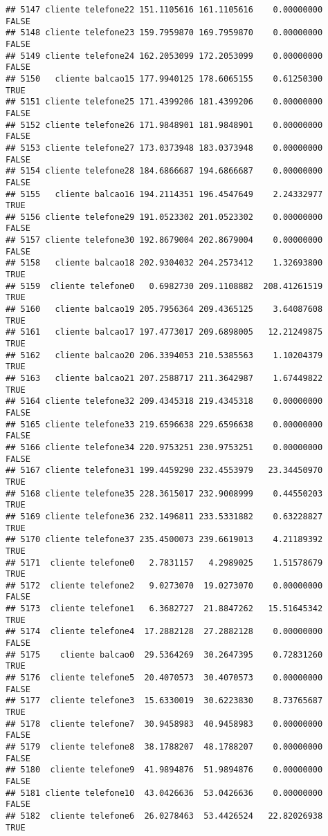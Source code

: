 \documentclass[
]{article}
\begin{document}
\begin{verbatim}
## 5147 cliente telefone22 151.1105616 161.1105616    0.00000000    FALSE
## 5148 cliente telefone23 159.7959870 169.7959870    0.00000000    FALSE
## 5149 cliente telefone24 162.2053099 172.2053099    0.00000000    FALSE
## 5150   cliente balcao15 177.9940125 178.6065155    0.61250300     TRUE
## 5151 cliente telefone25 171.4399206 181.4399206    0.00000000    FALSE
## 5152 cliente telefone26 171.9848901 181.9848901    0.00000000    FALSE
## 5153 cliente telefone27 173.0373948 183.0373948    0.00000000    FALSE
## 5154 cliente telefone28 184.6866687 194.6866687    0.00000000    FALSE
## 5155   cliente balcao16 194.2114351 196.4547649    2.24332977     TRUE
## 5156 cliente telefone29 191.0523302 201.0523302    0.00000000    FALSE
## 5157 cliente telefone30 192.8679004 202.8679004    0.00000000    FALSE
## 5158   cliente balcao18 202.9304032 204.2573412    1.32693800     TRUE
## 5159  cliente telefone0   0.6982730 209.1108882  208.41261519     TRUE
## 5160   cliente balcao19 205.7956364 209.4365125    3.64087608     TRUE
## 5161   cliente balcao17 197.4773017 209.6898005   12.21249875     TRUE
## 5162   cliente balcao20 206.3394053 210.5385563    1.10204379     TRUE
## 5163   cliente balcao21 207.2588717 211.3642987    1.67449822     TRUE
## 5164 cliente telefone32 209.4345318 219.4345318    0.00000000    FALSE
## 5165 cliente telefone33 219.6596638 229.6596638    0.00000000    FALSE
## 5166 cliente telefone34 220.9753251 230.9753251    0.00000000    FALSE
## 5167 cliente telefone31 199.4459290 232.4553979   23.34450970     TRUE
## 5168 cliente telefone35 228.3615017 232.9008999    0.44550203     TRUE
## 5169 cliente telefone36 232.1496811 233.5331882    0.63228827     TRUE
## 5170 cliente telefone37 235.4500073 239.6619013    4.21189392     TRUE
## 5171  cliente telefone0   2.7831157   4.2989025    1.51578679     TRUE
## 5172  cliente telefone2   9.0273070  19.0273070    0.00000000    FALSE
## 5173  cliente telefone1   6.3682727  21.8847262   15.51645342     TRUE
## 5174  cliente telefone4  17.2882128  27.2882128    0.00000000    FALSE
## 5175    cliente balcao0  29.5364269  30.2647395    0.72831260     TRUE
## 5176  cliente telefone5  20.4070573  30.4070573    0.00000000    FALSE
## 5177  cliente telefone3  15.6330019  30.6223830    8.73765687     TRUE
## 5178  cliente telefone7  30.9458983  40.9458983    0.00000000    FALSE
## 5179  cliente telefone8  38.1788207  48.1788207    0.00000000    FALSE
## 5180  cliente telefone9  41.9894876  51.9894876    0.00000000    FALSE
## 5181 cliente telefone10  43.0426636  53.0426636    0.00000000    FALSE
## 5182  cliente telefone6  26.0278463  53.4426524   22.82026938     TRUE

\end{verbatim}
\end{document}
